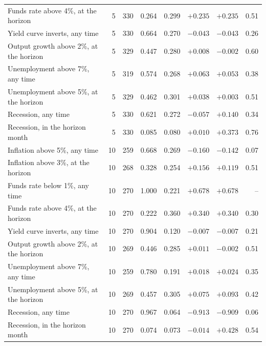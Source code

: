 \begin{longtable}{lrrrrrrr}
Funds rate above 4\%, at the horizon & 5 & 330 & 0.264 & 0.299 & $+0.235$ & $+0.235$ & 0.51 \\
Yield curve inverts, any time & 5 & 330 & 0.664 & 0.270 & $-0.043$ & $-0.043$ & 0.26 \\
Output growth above 2\%, at the horizon & 5 & 329 & 0.447 & 0.280 & $+0.008$ & $-0.002$ & 0.60 \\
Unemployment above 7\%, any time & 5 & 319 & 0.574 & 0.268 & $+0.063$ & $+0.053$ & 0.38 \\
Unemployment above 5\%, at the horizon & 5 & 329 & 0.462 & 0.301 & $+0.038$ & $+0.003$ & 0.51 \\
Recession, any time & 5 & 330 & 0.621 & 0.272 & $-0.057$ & $+0.140$ & 0.34 \\
Recession, in the horizon month & 5 & 330 & 0.085 & 0.080 & $+0.010$ & $+0.373$ & 0.76 \\
Inflation above 5\%, any time & 10 & 259 & 0.668 & 0.269 & $-0.160$ & $-0.142$ & 0.07 \\
Inflation above 3\%, at the horizon & 10 & 268 & 0.328 & 0.254 & $+0.156$ & $+0.119$ & 0.51 \\
Funds rate below 1\%, any time & 10 & 270 & 1.000 & 0.221 & $+0.678$ & $+0.678$ & -- \\
Funds rate above 4\%, at the horizon & 10 & 270 & 0.222 & 0.360 & $+0.340$ & $+0.340$ & 0.30 \\
Yield curve inverts, any time & 10 & 270 & 0.904 & 0.120 & $-0.007$ & $-0.007$ & 0.21 \\
Output growth above 2\%, at the horizon & 10 & 269 & 0.446 & 0.285 & $+0.011$ & $-0.002$ & 0.51 \\
Unemployment above 7\%, any time & 10 & 259 & 0.780 & 0.191 & $+0.018$ & $+0.024$ & 0.35 \\
Unemployment above 5\%, at the horizon & 10 & 269 & 0.457 & 0.305 & $+0.075$ & $+0.093$ & 0.42 \\
Recession, any time & 10 & 270 & 0.967 & 0.064 & $-0.913$ & $-0.909$ & 0.06 \\
Recession, in the horizon month & 10 & 270 & 0.074 & 0.073 & $-0.014$ & $+0.428$ & 0.54 \\
\end{longtable}
